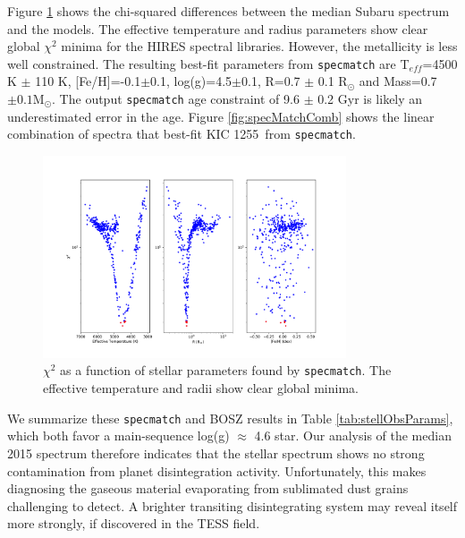 \documentclass[preprint]{aastex61}
\newcommand{\shStar}{KIC 1255}
\begin{document}
Figure \ref{fig:specMatch} shows the chi-squared differences between the median Subaru spectrum and the models.
The effective temperature and radius parameters show clear global $\chi^2$ minima for the HIRES spectral libraries.
However, the metallicity is less well constrained.
The resulting best-fit parameters from \texttt{specmatch} are T$_{eff}$=4500 K $\pm$ 110 K, [Fe/H]=-0.1$\pm$0.1, log(g)=4.5$\pm$0.1, R=0.7 $\pm$ 0.1 R$_\odot$ and Mass=0.7 $\pm 0.1 $M$_\odot$.
The output \texttt{specmatch} age constraint of 9.6 $\pm$ 0.2 Gyr is likely an underestimated error in the age.
Figure \ref{fig:specMatchComb} shows the linear combination of spectra that best-fit \shStar\ from \texttt{specmatch}.

\begin{figure}[!hbtp]
\begin{centering}
\includegraphics[width=0.8\textwidth]{images/subaru/spec_chi_min.pdf}
\caption{$\chi^2$ as a function of stellar parameters found by \texttt{specmatch}.
The effective temperature and radii show clear global minima.}\label{fig:specMatch}
\end{centering}
\end{figure}

We summarize these \texttt{specmatch} and BOSZ results in Table \ref{tab:stellObsParams}, which both favor a main-sequence log(g) $\approx$ 4.6 star.
Our analysis of the median 2015 spectrum therefore indicates that the stellar spectrum shows no strong contamination from planet disintegration activity.
Unfortunately, this makes diagnosing the gaseous material evaporating from sublimated dust grains challenging to detect.
A brighter transiting disintegrating system may reveal itself more strongly, if discovered in the TESS field.
\end{document}
